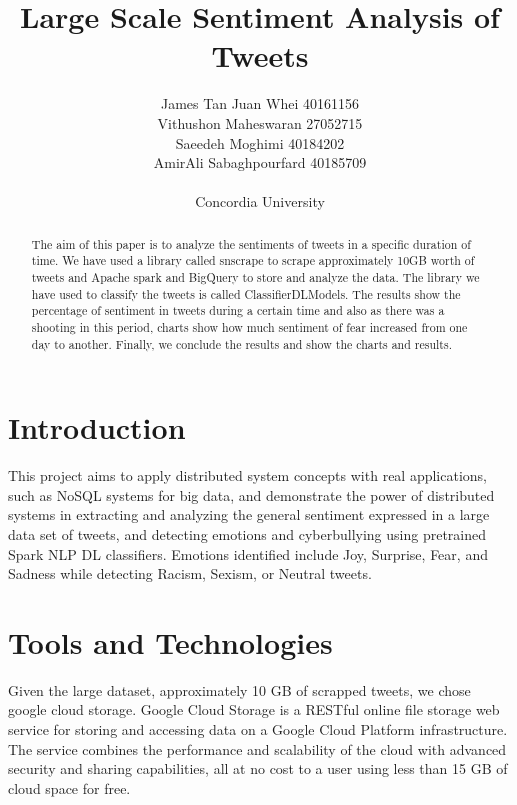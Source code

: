 \documentclass[a4paper,12pt]{article}
\begin{document}
\title{Large Scale Sentiment Analysis of Tweets }%
\author{
	James Tan Juan Whei 40161156\\
	Vithushon Maheswaran 27052715\\
	Saeedeh Moghimi 40184202\\
	AmirAli Sabaghpourfard 40185709\\
	\\Concordia University
}
\maketitle

\begin{abstract}
The aim of this paper is to analyze the sentiments of tweets in a specific duration of time. We have used a library called snscrape\cite{snscrape} to
scrape approximately 10GB worth of tweets and Apache spark and BigQuery to store and analyze the data.
The library we have used to classify the tweets is called ClassifierDLModels. The results show the percentage of sentiment in
tweets during a certain time and also as there was a shooting in this period, charts show how much sentiment of fear increased
from one day to another. Finally, we conclude the results and show the charts and results.
\end{abstract}

\section{Introduction}
This project aims to apply distributed system concepts with real applications, such as NoSQL systems for big data,
and demonstrate the power of distributed systems in extracting and analyzing the general sentiment expressed in a large
data set of tweets, and detecting emotions and cyberbullying using pretrained Spark NLP DL classifiers.
Emotions identified include Joy, Surprise, Fear, and Sadness while detecting Racism, Sexism, or Neutral tweets.

\section{Tools and Technologies}
Given the large dataset, approximately 10 GB of scrapped tweets, we chose google cloud storage.
Google Cloud Storage is a RESTful online file storage web service for storing and accessing data on a Google Cloud
Platform infrastructure. The service combines the performance and scalability of the cloud with advanced
security and sharing capabilities, all at no cost to a user using less than 15 GB of cloud space for free.
\end{document}
